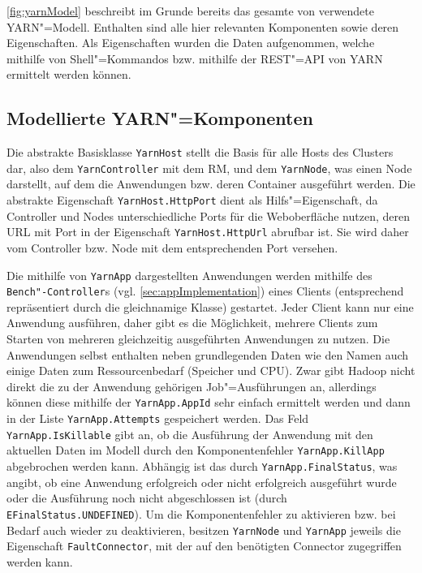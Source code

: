 \autoref{fig:yarnModel} beschreibt im Grunde bereits das gesamte von \sS verwendete YARN"=Modell.
Enthalten sind alle hier relevanten Komponenten sowie deren Eigenschaften.
Als Eigenschaften wurden die Daten aufgenommen, welche mithilfe von Shell"=Kommandos bzw. mithilfe der REST"=API von YARN ermittelt werden können.

\subsection{Modellierte YARN"=Komponenten}\label{sec:yarnComponents}

Die abstrakte Basisklasse \texttt{YarnHost} stellt die Basis für alle Hosts des Clusters dar, also dem \texttt{YarnController} mit dem \ac{RM}, und dem \texttt{YarnNode}, was einen Node darstellt, auf dem die Anwendungen bzw. deren Container ausgeführt werden.
Die abstrakte Eigenschaft \texttt{YarnHost.HttpPort} dient als Hilfs"=Eigenschaft, da Controller und Nodes unterschiedliche Ports für die Weboberfläche nutzen, deren URL mit Port in der Eigenschaft \texttt{YarnHost.HttpUrl} abrufbar ist.
Sie wird daher vom Controller bzw. Node mit dem entsprechenden Port versehen.

Die mithilfe von \texttt{YarnApp} dargestellten Anwendungen werden mithilfe des \texttt{Bench"-Controller}s (vgl. \autoref{sec:appImplementation}) eines Clients (entsprechend repräsentiert durch die gleichnamige Klasse) gestartet.
Jeder Client kann nur eine Anwendung ausführen, daher gibt es die Möglichkeit, mehrere Clients zum Starten von mehreren gleichzeitig ausgeführten Anwendungen zu nutzen.
Die Anwendungen selbst enthalten neben grundlegenden Daten wie \zB den Namen auch einige Daten zum Ressourcenbedarf (Speicher und CPU).
Zwar gibt Hadoop nicht direkt die zu der Anwendung gehörigen Job"=Ausführungen an, allerdings können diese mithilfe der \texttt{YarnApp.AppId} sehr einfach ermittelt werden und dann in der Liste \texttt{YarnApp.Attempts} gespeichert werden.
Das Feld \texttt{YarnApp.IsKillable} gibt an, ob die Ausführung der Anwendung mit den aktuellen Daten im Modell durch den Komponentenfehler \texttt{YarnApp.KillApp} abgebrochen werden kann.
Abhängig ist das durch \texttt{YarnApp.FinalStatus}, was angibt, ob eine Anwendung erfolgreich oder nicht erfolgreich ausgeführt wurde oder die Ausführung noch nicht abgeschlossen ist (durch \texttt{EFinalStatus.UNDEFINED}).
Um die Komponentenfehler zu aktivieren bzw. bei Bedarf auch wieder zu deaktivieren, besitzen \texttt{YarnNode} und \texttt{YarnApp} jeweils die Eigenschaft \texttt{FaultConnector}, mit der auf den benötigten Connector zugegriffen werden kann.

